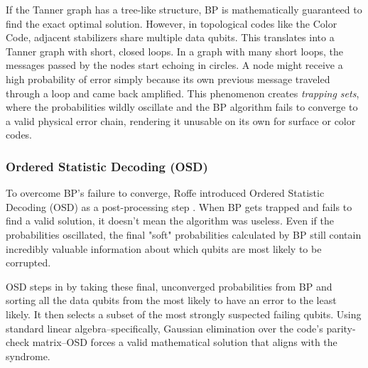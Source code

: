 If the Tanner graph has a tree-like structure, BP is mathematically guaranteed to find the exact optimal solution. However, in topological codes like the Color Code, adjacent stabilizers share multiple data qubits. This translates into a Tanner graph with short, closed loops. In a graph with many short loops, the messages passed by the nodes start echoing in circles. A node might receive a high probability of error simply because its own previous message traveled through a loop and came back amplified. This phenomenon creates \textit{trapping sets}, where the probabilities wildly oscillate and the BP algorithm fails to converge to a valid physical error chain, rendering it unusable on its own for surface or color codes.

\subsubsection*{Ordered Statistic Decoding (OSD)}

 To overcome BP's failure to converge, Roffe introduced Ordered Statistic Decoding (OSD) as a post-processing step \cite{Roffe_2020}. When BP gets trapped and fails to find a valid solution, it doesn't mean the algorithm was useless. Even if the probabilities oscillated, the final "soft" probabilities calculated by BP still contain incredibly valuable information about which qubits are most likely to be corrupted.

OSD steps in by taking these final, unconverged probabilities from BP and sorting all the data qubits from the most likely to have an error to the least likely. It then selects a subset of the most strongly suspected failing qubits. Using standard linear algebra--specifically, Gaussian elimination over the code's parity-check matrix--OSD forces a valid mathematical solution that aligns with the syndrome.

